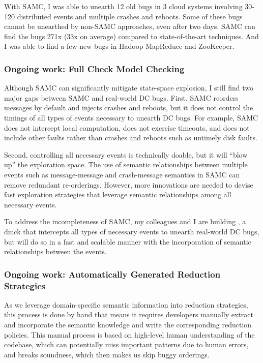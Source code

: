 \documentclass[11pt]{article}
\begin{document}
With SAMC, I was able to unearth 12 old bugs in 3 cloud systems involving 30-120
distributed events and multiple crashes and reboots. Some of these bugs cannot
be unearthed by non-SAMC approaches, even after two days. SAMC can find the bugs
271x (33x on average) compared to state-of-the-art techniques. And I was able to
find a few new bugs in Hadoop MapReduce and ZooKeeper.

\subsubsection*{Ongoing work: Full Check Model Checking} 

Although SAMC can significantly mitigate state-space explosion, I still find two
major gaps between SAMC and real-world DC bugs. First, SAMC reorders messages by
default and injects crashes and reboots, but it does not control the timings of
all types of events necessary to unearth DC bugs. For example, SAMC does not
intercept local computation, does not exercise timeouts, and does not include
other faults rather than crashes and reboots such as untimely disk faults.

Second, controlling all necessary events is technically doable, but it will
``blow up'' the exploration space. The use of semantic relationships between
multiple events such as message-message and crash-message semantics in SAMC can
remove redundant re-orderings. However, more innovations are needed to devise
fast exploration strategies that leverage semantic relationships among all
necessary events.

To address the incompleteness of SAMC, my colleagues and I are building
\fullcheck, a dmck that intercepts all types of necessary events to unearth
real-world DC bugs, but will do so in a fast and scalable manner with the
incorporation of semantic relationships between the events.

\subsubsection*{Ongoing work: Automatically Generated Reduction Strategies} 

As we leverage domain-specific semantic information into reduction strategies,
this process is done by hand that means it requires developers manually extract
and incorporate the semantic knowledge and write the corresponding reduction
policies. This manual process is based on high-level human understanding of the
codebase, which can potentially miss important patterns due to human errors, and
breaks soundness, which then makes us skip buggy orderings.
\end{document}
